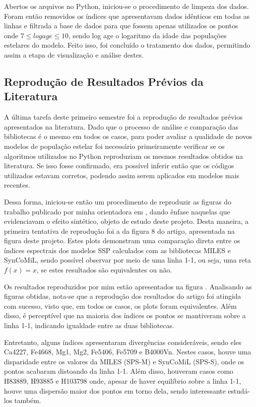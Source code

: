 \documentclass[12pt]{projeto}
\begin{document}
Abertos os arquivos no Python, iniciou-se o procedimento de limpeza dos dados. Foram então removidos os índices que apresentavam dados idênticos em todas as linhas e filtrada a base de dados para que fossem apenas utilizados os pontos onde \(7 \leq log age \leq 10\), sendo log age o logaritmo da idade das populações estelares do modelo. Feito isso, foi concluído o tratamento dos dados, permitindo assim a etapa de visualização e análise destes. 


\subsection{Reprodução de Resultados Prévios da Literatura}
A última tarefa deste primeiro semestre foi a reprodução de resultados prévios apresentados na literatura. Dado que o processo de análise e comparação das bibliotecas é o mesmo em todos os casos, para poder avaliar a qualidade de novos modelos de população estelar foi necessário primeiramente verificar se os algoritmos utilizados no Python reproduziam os mesmos resultados obtidos na literatura. Se isso fosse confirmado, era possível inferir então que os códigos utilizados estavam corretos, podendo assim serem aplicados em modelos mais recentes.

Dessa forma, iniciou-se então um procedimento de reproduzir as figuras do trabalho publicado por minha orientadora em \cite{Paula2020}, dando ênfase naquelas que evidenciavam o efeito sintético, objeto de estudo deste projeto. Desta maneira, a primeira tentativa de reprodução foi a da figura 8 do artigo, apresentada na figura  deste projeto. Estes plots demonstram uma comparação direta entre os índices espectrais dos modelos SSP calculados com as bibliotecas MILES  e SynCoMiL, sendo possível observar por meio de uma linha 1-1, ou seja, uma reta \(f(x) = x\), se estes resultados são equivalentes ou não.



Os resultados reproduzidos por mim estão apresentados na figura .
Analisando as figuras obtidas, nota-se que a reprodução dos resultados do artigo foi atingida com sucesso, visto que, em todos os casos, os plots foram equivalentes. Além disso, é perceptível que na maioria dos índices os pontos se mantiveram sobre a linha 1-1, indicando igualdade entre as duas bibliotecas. 

Entretanto, alguns índices apresentaram divergências consideráveis, sendo eles Ca4227, Fe4668, Mg1, Mg2, Fe5406, Fe5709 e B4000Vn. Nestes casos, houve uma disparidade entre os valores da MILES (SPS-M) e SynCoMiL (SPS-S), onde os pontos acabaram distoando da linha 1-1. Além disso, houveram casos como H83889, H93885 e H103798 onde, apesar de haver equilíbrio sobre a linha 1-1, houve uma dispersão maior dos pontos em torno dela, sendo interessante estudá-los também. 
\end{document}
